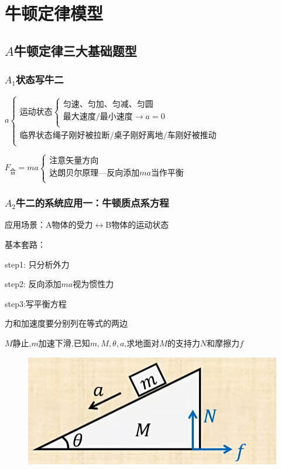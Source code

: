 \documentclass[lang=cn,10pt]{elegantbook}
\begin{document}
	\chapter{牛顿定律模型}
	\section{$A$牛顿定律三大基础题型}
	\subsection{$A_1$状态写牛二}
	$a\left\{ \begin{array}{c}
		\text{运动状态}\begin{cases}
			\text{匀速、匀加、匀减、匀圆}\\
			\text{最大速度}/\text{最小速度}\rightarrow a=0\\
		\end{cases}\\
		\text{临界状态} \text{绳子刚好被拉断}/\text{桌子刚好离地}/\text{车刚好被推动}\\
	\end{array} \right. $
	
$	F_{\text{合}}=ma\left\{ \begin{array}{c}
		\text{注意矢量方向}\\
		\text{达朗贝尔原理}—\text{反向添加}ma\text{当作平衡}\\
	\end{array} \right. $
	\vspace{2cm}
	\subsection{$A_2$牛二的系统应用一：牛顿质点系方程}
	应用场景：A物体的受力$\leftrightarrow$B物体的运动状态
	
	基本套路：
	
	step1: 只分析外力
	
	step2: 反向添加$ma$视为惯性力
	
	step3:写平衡方程
	
	\begin{remark}
		力和加速度要分别列在等式的两边
	\end{remark}
	\begin{example}
		$M\text{静止,}m\text{加速下滑,已知}m\mathrm{,}M\mathrm{,}\theta\mathrm{,}a\text{,求地面对}M\text{的支持力}N\text{和摩擦力}f$
		\begin{figure}[H]
			\centering
			\includegraphics[width=0.3\linewidth]{image/30}
		\end{figure}
		
	\end{example}
\end{document}
